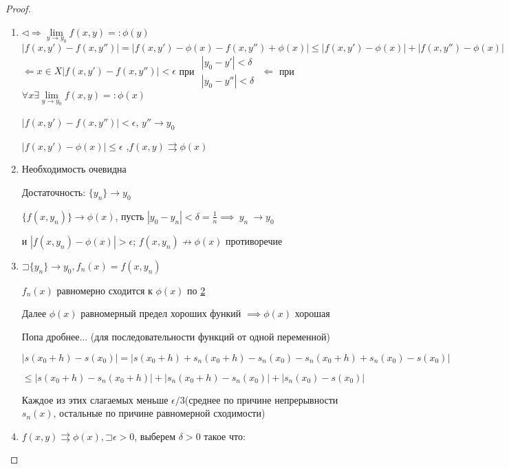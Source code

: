 \documentclass[a4paper]{article}
\newcommand\letsymbol{\mathord{\sqsupset}}
\theoremstyle{definition}
\theoremstyle{remark}
\begin{document}
\begin{proof}
    \begin{enumerate}
         \item $\triangleleft \Rightarrow  \lim\limits_{y \to y_0}f(x,y) =: \phi(y)$\hfill \break 
         $|f(x,y') - f(x,y'')| = |f(x,y') - \phi(x) - f(x,y'')+\phi(x)| \le |f(x,y') - \phi(x)| + |f(x,y'')-\phi(x)|$\hfill \break
         $\Leftarrow x \in X |f(x,y') - f(x,y'')| < \epsilon$ при
         $
         \begin{array}{l}
              |y_0 - y'|< \delta\\
              |y_0 - y''|<\delta
         \end{array}
         $
         $\Leftarrow$ при $\forall x \exists \lim\limits_{y\to y_0}f(x,y)=:\phi(x)$
    
         $|f(x,y')-f(x,y'')| < \epsilon$, $y''\rightarrow y_0$
    
         $|f(x,y')-\phi(x)| \le\epsilon$ ,$f(x,y) \rightrightarrows \phi(x)$
         \item \hypertarget{p1}{Необходимость очевидна}
         
         Достаточность: $\{y_n\} \rightarrow y_0$
    
         $\{f(x,y_n)\} \rightarrow \phi(x)$, пусть $|y_0 - y_n|< \delta = \frac{1}{n} \implies {\ y_n}\ \rightarrow y_0$ 
         
         и $|f(x,y_n) - \phi(x)|>\epsilon$; $f(x,y_n) \nrightarrow\phi(x)$ противоречие
         \item $\letsymbol \{y_n \} \rightarrow y_0, f_n(x) = f(x, y_n)$
         
         $f_n(x)$ равномерно сходится к $\phi(x)$ по \hyperlink{p1}{2}
    
         Далее $\phi(x)$  равномерный предел хороших функий $\implies \phi(x)$ хорошая

         Попа дробнее... (для последовательности функций от одной переменной)

         $|s(x_0+h) - s(x_0)| = |s(x_0+h) + s_n(x_0 + h) - s_n(x_0) - s_n(x_0+h) + s_n(x_0)- s(x_0)|$ 
         
         $\leq |s(x_0+h) - s_n(x_0 + h)| + |s_n(x_0 + h) - s_n(x_0)| + |s_n(x_0) - s(x_0)|$

         Каждое из этих слагаемых меньше $\epsilon/3$(среднее по причине непрерывности $s_n(x)$, остальные по причине равномерной сходимости)
         \item $f(x,y) \rightrightarrows \phi(x), \letsymbol \epsilon>0$, выберем $\delta >0$ такое что:
         

\end{enumerate}
\end{proof}
\end{document}
